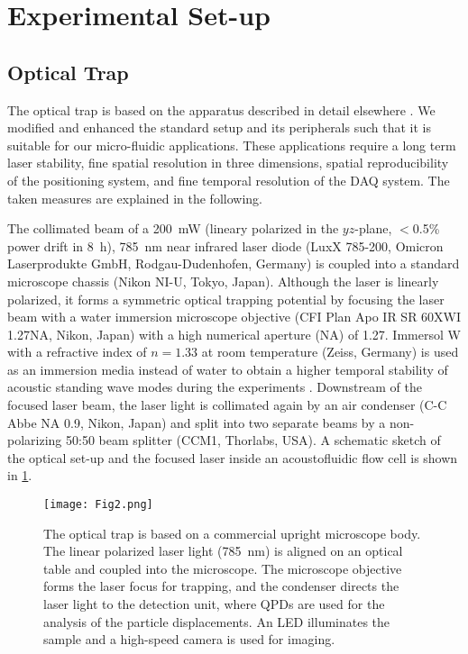 \section{Experimental Set-up\label{sec:experimentalSetUp}}
\subsection{Optical Trap\label{sec:opticalTrap}}

The optical trap is based on the apparatus described in detail elsewhere 
\cite{Bodensiek}. We modified and enhanced the standard setup and its 
peripherals such that it is suitable for our micro-fluidic applications. These 
applications require a long term laser stability, fine spatial resolution in 
three dimensions, spatial reproducibility of the positioning system, and fine 
temporal resolution of the DAQ system. The taken measures are explained in the 
following.

The collimated beam of a \SI{200}{\milli\watt} (lineary polarized in the 
$yz$-plane, $<$0.5\% power drift in \SI{8}{\hour}), \SI{785}{\nano\meter} near 
infrared laser diode (LuxX 785-200, Omicron Laserprodukte GmbH, 
Rodgau-Dudenhofen, Germany) is coupled into a standard microscope chassis (Nikon 
NI-U, Tokyo, Japan).  Although the laser is linearly polarized, it forms a 
symmetric optical trapping potential by focusing the laser beam with a water 
immersion microscope objective (CFI Plan Apo IR SR 60XWI 1.27NA, Nikon, Japan) 
with a high numerical aperture (NA) of 1.27. Immersol W with a refractive index 
of $n=1.33$ at room temperature (Zeiss, Germany) is used as an immersion media 
instead of water to obtain a higher temporal stability of acoustic standing wave 
modes during the experiments \cite{Lamprecht2016}.  Downstream of the focused 
laser beam, the laser light is collimated again by an air condenser (C-C Abbe NA 
0.9, Nikon, Japan) and split into two separate beams by a non-polarizing 50:50 
beam splitter (CCM1, Thorlabs, USA). A schematic sketch of the optical set-up 
and the focused laser inside an acoustofluidic flow cell is shown in 
\cref{fig:Fig2}.

\begin{figure}[tb]
    \centering
    \texttt{[image: Fig2.png]}
    \caption{The optical trap is based on a commercial upright microscope body.  
        The linear polarized laser light (\SI{785}{\nano\meter}) is aligned on 
        an optical table and coupled into the microscope. The microscope 
        objective forms the laser focus for trapping, and the condenser directs 
    the laser light to the detection unit, where QPDs are used for the analysis 
  of the particle displacements. An LED illuminates the sample and a high-speed 
camera is used for imaging.\label{fig:Fig2}}
\end{figure}%


